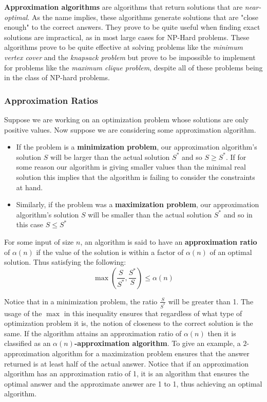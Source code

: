 
\textbf{Approximation algorithms} are algorithms that return solutions that are \textit{near-optimal}. As the name implies, these algorithms generate solutions that are 
"close enough" to the correct answers. They prove to be quite useful when finding exact solutions are impractical, as in most large cases for NP-Hard problems. These algorithms prove to be quite effective at solving problems like
the \textit{minimum vertex cover} and the \textit{knapsack problem } but prove to be impossible to implement for problems like the \textit{maximum clique problem}, despite all of these problems being in the class of NP-hard problems.

\subsubsection{Approximation Ratios}

Suppose we are working on an optimization problem whose solutions are only positive values. Now suppose we are considering some approximation algorithm. 
\begin{itemize}
    \item If the problem is a \textbf{minimization problem}, our approximation algorithm's solution $S$ will be larger than the actual solution $S^*$ and so $S\geq S^*$. If for some reason our algorithm is giving smaller values than the minimal real solution this implies that the algorithm is failing to consider the constraints at hand.
    \item Similarly, if the problem was a \textbf{maximization problem}, our approximation algorithm's solution $S$ will be smaller than the actual solution $S^*$ and so in this case $S\leq S^*$
\end{itemize}

\noindent For some input of size $n$, an algorithm is said to have an \textbf{approximation ratio} of $\alpha(n)$ if the value of the solution is within a factor of $\alpha(n)$ of an optimal solution. Thus satisfying the following:
\[\max(\frac{S}{S^*},\frac{S^*}{S} ) \leq \alpha(n)\]

\noindent Notice that in a minimization problem, the ratio $\frac{S}{S^*}$ will be greater than 1. The usage of the $\max$ in this inequality ensures that 
regardless of what type of optimization problem it is, the notion of
closeness to the correct solution is the same. If the algorithm attains an approximation ratio of $\alpha(n)$ then it is classified as an \textbf{$\alpha(n)$-approximation algorithm}. To give an example, a $2$-approximation algorithm for a maximization problem ensures that the answer returned is at least half of the actual answer. Notice that if an approximation algorithm has an approximation ratio of 1, it is an algorithm that ensures the optimal answer and the approximate answer are 1 to 1, thus achieving an optimal algorithm.


